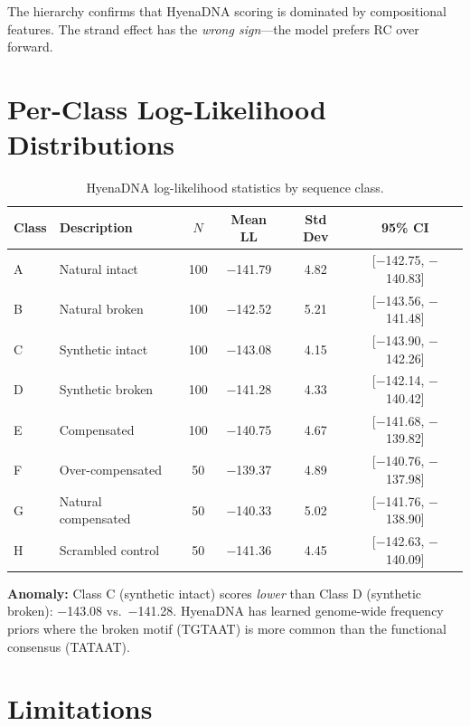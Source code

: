\documentclass{article}
\begin{document}
The hierarchy confirms that HyenaDNA scoring is dominated by compositional features.
The strand effect has the \emph{wrong sign}---the model prefers RC over forward.

\section{Per-Class Log-Likelihood Distributions}
\label{app:distributions}

\begin{table}[ht]
\caption{HyenaDNA log-likelihood statistics by sequence class.}
\label{tab:class_ll}
\centering\small
\begin{tabular}{llcccc}
\toprule
Class & Description & $N$ & Mean LL & Std Dev & 95\% CI \\
\midrule
A & Natural intact      & 100 & $-$141.79 & 4.82 & [$-$142.75, $-$140.83] \\
B & Natural broken      & 100 & $-$142.52 & 5.21 & [$-$143.56, $-$141.48] \\
C & Synthetic intact    & 100 & $-$143.08 & 4.15 & [$-$143.90, $-$142.26] \\
D & Synthetic broken    & 100 & $-$141.28 & 4.33 & [$-$142.14, $-$140.42] \\
E & Compensated         & 100 & $-$140.75 & 4.67 & [$-$141.68, $-$139.82] \\
F & Over-compensated    &  50 & $-$139.37 & 4.89 & [$-$140.76, $-$137.98] \\
G & Natural compensated &  50 & $-$140.33 & 5.02 & [$-$141.76, $-$138.90] \\
H & Scrambled control   &  50 & $-$141.36 & 4.45 & [$-$142.63, $-$140.09] \\
\bottomrule
\end{tabular}
\end{table}

\textbf{Anomaly:} Class C (synthetic intact) scores \emph{lower} than Class D (synthetic
broken): $-$143.08 vs.\ $-$141.28.
HyenaDNA has learned genome-wide frequency priors where the broken motif (TGTAAT) is more
common than the functional consensus (TATAAT).

\section{Limitations}
\label{app:limitations}
\end{document}
